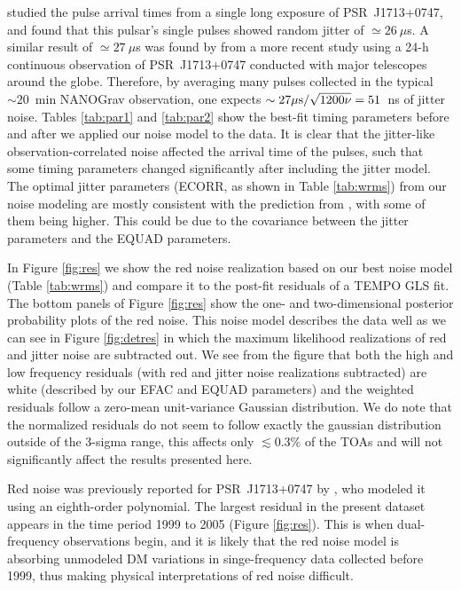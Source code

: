 \citet{sc12} studied the pulse arrival times from a single long exposure of
PSR~J1713+0747, and found that this pulsar's single pulses showed random jitter of
$\simeq26~\mu$s. 
A similar result of $\simeq27~\mu$s was found by \citet{dlc+14} from a more recent study using a 24-h continuous observation of PSR~J1713+0747 conducted with major telescopes around the globe.
Therefore, by averaging many pulses collected in the typical
$\sim20$~min NANOGrav observation, one expects $\sim27\mu{\rm s}/\sqrt{1200\nu}=51$~ns of jitter noise. 
Tables \ref{tab:par1} and \ref{tab:par2} show the best-fit timing parameters before and
after we applied our noise model to the data. It is clear that the jitter-like
observation-correlated noise affected the arrival time of the pulses, such that 
some timing parameters changed significantly after including the jitter model.
The optimal jitter parameters (ECORR, as shown in Table \ref{tab:wrms}) from
our noise modeling are mostly consistent with the prediction from
\citet{sc12}, with some of them being higher. This could be due to the
covariance between the jitter parameters and the EQUAD parameters.

In Figure \ref{fig:res} we show the red noise realization based on our best
noise model (Table \ref{tab:wrms}) and compare it to the post-fit residuals of
a {\sc TEMPO} GLS fit.
The bottom
panels of Figure \ref{fig:res} show the one- and two-dimensional posterior probability plots
of the red noise. This noise model describes the data well as we can see in
Figure \ref{fig:detres} in which the maximum likelihood realizations of red
and jitter noise are subtracted out. We see from the figure that both the high
and low frequency residuals (with red and jitter noise realizations
subtracted) are white (described by our EFAC and EQUAD parameters) and the
weighted residuals follow a zero-mean unit-variance Gaussian distribution. We
do note that the normalized residuals do not seem to follow exactly the gaussian 
distribution outside of the 3-sigma range, this affects only $\lesssim0.3$\% of the TOAs 
and will not significantly affect the results presented here. 

Red noise was previously reported for PSR~J1713+0747 by \citet{sns+05}, who
modeled it using an eighth-order polynomial. The largest residual in the
present dataset appears in the time period 1999 to 2005 (Figure
\ref{fig:res}). This is when dual-frequency observations begin, and it is
likely that the red noise model is absorbing unmodeled DM variations in
singe-frequency data collected before 1999, thus making physical
interpretations of red noise difficult.

